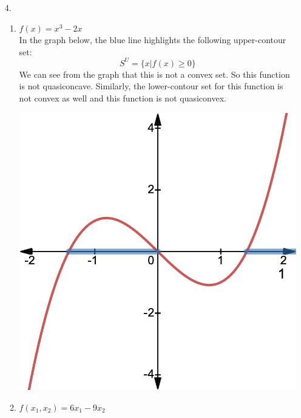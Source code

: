 \documentclass{./../../Latex/homework}
\begin{document}
\begin{enumerate}
\item [4.]
\begin{enumerate}
  \item $f(x)=x^{3}-2 x$ \\
  In the graph below, the blue line highlights the following upper-contour set:
  $$  S^U = \{x | f(x) \geq 0 \} $$
  We can see from the graph that this is not a convex set. So this function is not quasiconcave. Similarly, the lower-contour set for this function is not convex as well and this function is not quasiconvex. 
  \begin{center}
  	\includegraphics[scale=0.25]{desmos-graph.png}
  \end{center}

  \item $f\left(x_{1}, x_{2}\right)=6 x_{1}-9 x_{2}$
  

\end{enumerate}
\end{enumerate}
\end{document}
